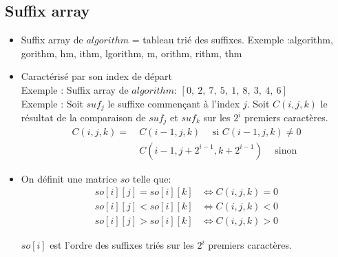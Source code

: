 \subsection{Suffix array}
\begin{itemize}
\item Suffix array de $algorithm$ = tableau trié des suffixes. Exemple :algorithm, gorithm, hm, ithm, lgorithm, m, orithm, rithm, thm

\item Caractérisé par son index de départ\\
Exemple : Suffix array de $algorithm$: $[0, \ 2, \ 7, \ 5, \ 1, \ 8, \ 3, \ 4, \ 6]$\\
Exemple : Soit $suf_j$ le suffixe commençant à l'index $j$. Soit $C(i, j, k)$ le résultat de la comparaison de $suf_j$ et $suf_k$ sur les $2^i$ premiers caractères.
\begin{align*}
C(i, j, k) = & \ C(i - 1, j, k) \hspace{15pt} \text{si $C(i - 1, j, k) \neq 0$} \\
             & \ C(i - 1, j + 2^{i - 1}, k + 2^{i - 1}) \hspace{15pt} \text{sinon}
\end{align*}

\end{itemize}
\begin{itemize}

\item On définit une matrice $so$ telle que:
\begin{align*}
so[i][j] = so[i][k] & \Leftrightarrow C(i, j, k) = 0 \\
so[i][j] < so[i][k] & \Leftrightarrow C(i, j, k) < 0 \\
so[i][j] > so[i][k] & \Leftrightarrow C(i, j, k) > 0 
\end{align*}

$so[i]$ est l'ordre des suffixes triés sur les $2^i$ premiers caractères.

\end{itemize}

